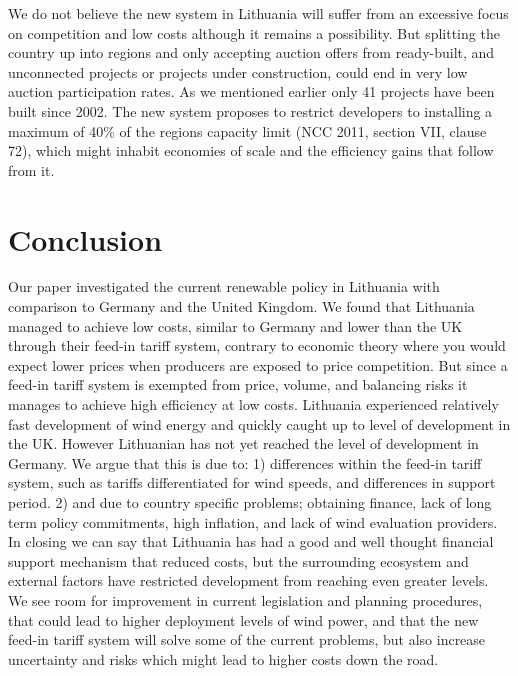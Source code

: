 \documentclass[a4paper, 12pt]{article}
\begin{document}
We do not believe the new system in Lithuania will suffer from an excessive focus on competition and low costs although it remains a possibility. But splitting the country up into regions and only accepting auction offers from ready-built, and unconnected projects or projects under construction, could end in very low auction participation rates. As we mentioned earlier only 41 projects have been built since 2002. The new system proposes to restrict developers to installing a maximum of 40\% of the regions capacity limit (NCC 2011, section VII, clause 72), which might inhabit economies of scale and the efficiency gains that follow from it.

\section{Conclusion}
Our paper investigated the current renewable policy in Lithuania with comparison to Germany and the United Kingdom. We found that Lithuania managed to achieve low costs, similar to Germany and lower than the UK through their feed-in tariff system, contrary to economic theory where you would expect lower prices when producers are exposed to price competition. But since a feed-in tariff system is exempted from price, volume, and balancing risks it manages to achieve high efficiency at low costs. Lithuania experienced relatively fast development of wind energy and quickly caught up to level of development in the UK. However Lithuanian has not yet reached the level of development in Germany. We argue that this is due to: 1) differences within the feed-in tariff system, such as tariffs differentiated for wind speeds, and differences in support period. 2) and due to country specific problems; obtaining finance, lack of long term policy commitments, high inflation, and lack of wind evaluation providers. In closing we can say that Lithuania has had a good and well thought financial support mechanism that reduced costs, but the surrounding ecosystem and external factors have restricted development from reaching even greater levels. We see room for improvement in current legislation and planning procedures, that could lead to higher deployment levels of wind power, and that the new feed-in tariff system will solve some of the current problems, but also increase uncertainty and risks which might lead to higher costs down the road.

\nocite{*}

\end{document}
